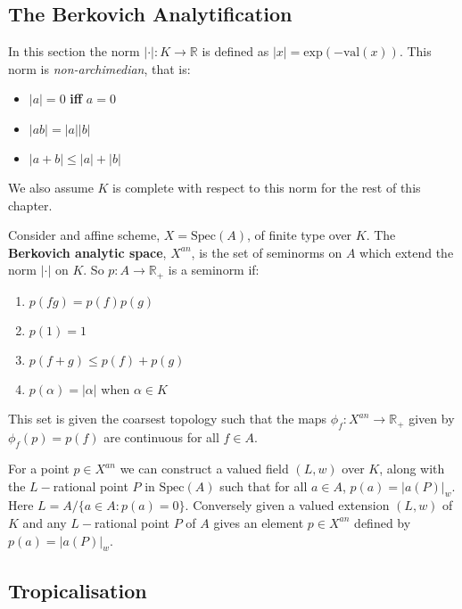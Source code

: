 \subsection{The Berkovich Analytification}
    In this section the norm $|\cdot |:K \to \mathbb{R}$ is defined as $|x| = \text{exp}(-\text{val}(x))$. This norm is \textit{non-archimedian}, that is: 
    \begin{itemize}
        \item $|a| = 0$ \textbf{iff} $a=0$
        \item $|ab| = |a||b|$
        \item $|a+b| \leq |a|+|b|$
    \end{itemize}
    We also assume $K$ is complete with respect to this norm for the rest of this chapter.
    \begin{definition}
        Consider and affine scheme, $X = \text{Spec}(A)$, of finite type over $K$. 
        The \textbf{Berkovich analytic space}, $X^{an}$, is the set of seminorms on $A$ which extend the norm $|\cdot|$ on $K$. 
        So $p:A \to \mathbb{R}_{+}$ is a seminorm if:
        \begin{enumerate}
            \item $p(fg) = p(f)p(g)$
            \item $p(1)=1$
            \item $p(f+g)\leq p(f)+p(g)$
            \item $p(\alpha) = |\alpha|$ when $\alpha \in K$
        \end{enumerate}
        This set is given the coarsest topology such that the maps $\phi_f:X^{an}\to \mathbb{R}_{+}$ given by $\phi_f(p) = p(f)$ are continuous for all $f \in A$.
    \end{definition}
    For a point $p \in X^{an}$ we can construct a valued field $(L,w)$ over $K$, along with the $L-$rational point $P$ in $\text{Spec}(A)$ such that for all $a \in A$, $p(a) = |a(P)|_{w}$. 
    Here $L = A/\{a \in A: p(a)=0\}$. 
    Conversely given a valued extension $(L,w)$ of $K$ and any $L-$rational point $P$ of $A$ gives an element $p \in X^{an}$ defined by $p(a) = |a(P)|_{w}$.
\subsection{Tropicalisation}


